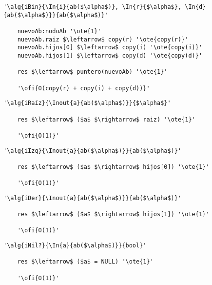 	\begin{lstlisting}[mathescape]
	'\alg{iBin}{\In{i}{ab($\alpha$)}, \In{r}{$\alpha$},	\In{d}{ab($\alpha$)}}{ab($\alpha$)}'

	nuevoAb:nodoAb '\ote{1}'
	nuevoAb.raiz $\leftarrow$ copy(r) '\ote{copy(r)}'
	nuevoAb.hijos[0] $\leftarrow$ copy(i) '\ote{copy(i)}'
	nuevoAb.hijos[1] $\leftarrow$ copy(d) '\ote{copy(d)}'

	res $\leftarrow$ puntero(nuevoAb) '\ote{1}'

	'\ofi{O(copy(r) + copy(i) + copy(d))}'
	\end{lstlisting}

	\begin{lstlisting}[mathescape]
	'\alg{iRaíz}{\Inout{a}{ab($\alpha$)}}{$\alpha$}'

	res $\leftarrow$ ($a$ $\rightarrow$ raiz) '\ote{1}'

	'\ofi{O(1)}'
	\end{lstlisting}

	\begin{lstlisting}[mathescape]
	'\alg{iIzq}{\Inout{a}{ab($\alpha$)}}{ab($\alpha$)}'

	res $\leftarrow$ ($a$ $\rightarrow$ hijos[0]) '\ote{1}'

	'\ofi{O(1)}'
	\end{lstlisting}

	\begin{lstlisting}[mathescape]
	'\alg{iDer}{\Inout{a}{ab($\alpha$)}}{ab($\alpha$)}'

	res $\leftarrow$ ($a$ $\rightarrow$ hijos[1]) '\ote{1}'

	'\ofi{O(1)}'
	\end{lstlisting}

	\begin{lstlisting}[mathescape]
	'\alg{iNil?}{\In{a}{ab($\alpha$)}}{bool}'

	res $\leftarrow$ ($a$ = NULL) '\ote{1}'

	'\ofi{O(1)}'
	\end{lstlisting}

